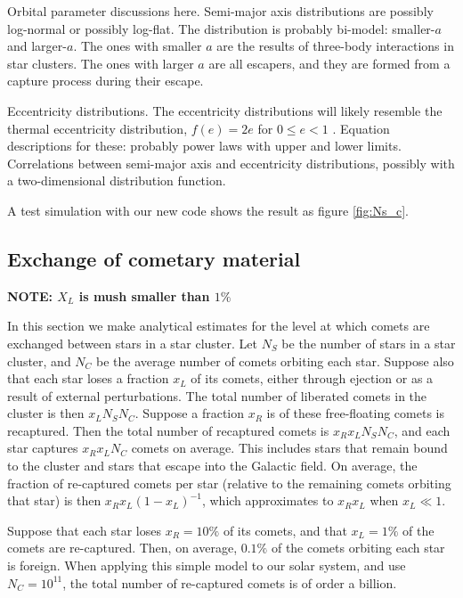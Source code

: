 \documentclass[usenatbib]{mn2e}
\begin{document}
Orbital parameter discussions here. Semi-major axis distributions are possibly log-normal or possibly log-flat. The distribution is probably bi-model: smaller-$a$ and larger-$a$. The ones with smaller $a$ are the results of three-body interactions in star clusters. The ones with larger $a$ are all escapers, and they are formed from a capture process during their escape.

Eccentricity distributions. The eccentricity distributions will likely resemble the thermal eccentricity distribution, $f(e)=2e$ for $0\leq e < 1$ \citep{heggie:1975aa}. Equation descriptions for these: probably power laws with upper and lower limits. Correlations between semi-major axis and eccentricity distributions, possibly with a two-dimensional distribution function. 

A test simulation with our new code shows the result as figure \ref{fig:Ns_c}. 



\subsection{Exchange of cometary material}

\textbf{NOTE: $X_{L}$ is mush smaller than $1\%$}

In this section we make analytical estimates for the level at which comets are exchanged between stars in a star cluster. Let $N_S$ be the number of stars in a star cluster, and $N_C$ be the average number of comets orbiting each star. Suppose also that each star loses a fraction $x_L$ of its comets, either through ejection or as a result of external perturbations. The total number of liberated comets in the cluster is then $x_LN_SN_C$. Suppose a fraction $x_R$ is of these free-floating comets is recaptured. Then the total number of recaptured comets is $x_Rx_LN_SN_C$, and each star captures $x_Rx_LN_C$ comets on average. This includes stars that remain bound to the cluster and stars that escape into the Galactic field. On average, the fraction of re-captured comets per star (relative to the remaining comets orbiting that star) is then $x_Rx_L(1-x_L)^{-1}$, which approximates to $x_Rx_L$ when $x_L\ll 1$. 

Suppose that each star loses $x_R=10\%$ of its comets, and that $x_L=1\%$ of the comets are re-captured. Then, on average, $0.1\%$ of the comets orbiting each star is foreign. When applying this simple model to our solar system, and use $N_C=10^{11}$, the total number of re-captured comets is of order a billion.
\end{document}
